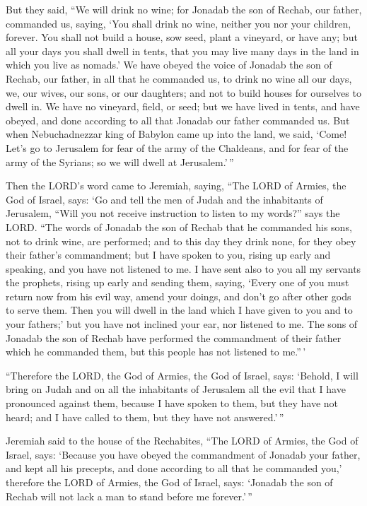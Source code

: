  But they said, ``We will drink no wine; for Jonadab the son
of Rechab, our father, commanded us, saying, `You shall drink no wine,
neither you nor your children, forever.  You shall not build
a house, sow seed, plant a vineyard, or have any; but all your days you
shall dwell in tents, that you may live many days in the land in which
you live as nomads.'  We have obeyed the voice of Jonadab
the son of Rechab, our father, in all that he commanded us, to drink no
wine all our days, we, our wives, our sons, or our daughters;
 and not to build houses for ourselves to dwell in. We have
no vineyard, field, or seed;  but we have lived in tents,
and have obeyed, and done according to all that Jonadab our father
commanded us.  But when Nebuchadnezzar king of Babylon came
up into the land, we said, `Come! Let's go to Jerusalem for fear of the
army of the Chaldeans, and for fear of the army of the Syrians; so we
will dwell at Jerusalem.'\,''

 Then the LORD's word came to Jeremiah, saying,
 ``The LORD of Armies, the God of Israel, says: `Go and
tell the men of Judah and the inhabitants of Jerusalem, ``Will you not
receive instruction to listen to my words?'' says the LORD.
 ``The words of Jonadab the son of Rechab that he commanded
his sons, not to drink wine, are performed; and to this day they drink
none, for they obey their father's commandment; but I have spoken to
you, rising up early and speaking, and you have not listened to me.
 I have sent also to you all my servants the prophets,
rising up early and sending them, saying, `Every one of you must return
now from his evil way, amend your doings, and don't go after other gods
to serve them. Then you will dwell in the land which I have given to you
and to your fathers;' but you have not inclined your ear, nor listened
to me.  The sons of Jonadab the son of Rechab have
performed the commandment of their father which he commanded them, but
this people has not listened to me.''\,'

 ``Therefore the LORD, the God of Armies, the God of
Israel, says: `Behold, I will bring on Judah and on all the inhabitants
of Jerusalem all the evil that I have pronounced against them, because I
have spoken to them, but they have not heard; and I have called to them,
but they have not answered.'\,''

 Jeremiah said to the house of the Rechabites, ``The LORD
of Armies, the God of Israel, says: `Because you have obeyed the
commandment of Jonadab your father, and kept all his precepts, and done
according to all that he commanded you,'  therefore the
LORD of Armies, the God of Israel, says: `Jonadab the son of Rechab will
not lack a man to stand before me forever.'\,''

